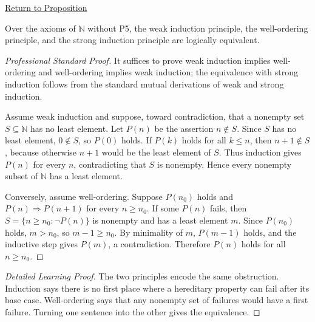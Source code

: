 \newpage
{}
\label{prf:induction-well-ordering-equivalent}

\begin{remark*}[Return]
\hyperref[prop:induction-well-ordering-equivalent]{Return to Proposition}
\end{remark*}

\begin{proposition*}
Over the axioms of $\mathbb{N}$ without P5, the weak induction principle,
the well-ordering principle, and the strong induction principle are
logically equivalent.
\end{proposition*}

\begin{proof}[Professional Standard Proof]
\LRAProofBodyStart
It suffices to prove weak induction implies well-ordering and
well-ordering implies weak induction; the equivalence with strong
induction follows from the standard mutual derivations of weak and strong
induction.

Assume weak induction and suppose, toward contradiction, that a nonempty
set $S \subseteq \mathbb{N}$ has no least element. Let
$P(n)$ be the assertion $n \notin S$. Since $S$ has no least element,
$0 \notin S$, so $P(0)$ holds. If $P(k)$ holds for all $k \le n$, then
$n+1 \notin S$, because otherwise $n+1$ would be the least element of $S$.
Thus induction gives $P(n)$ for every $n$, contradicting that $S$ is
nonempty. Hence every nonempty subset of $\mathbb{N}$ has a least element.

Conversely, assume well-ordering. Suppose $P(n_0)$ holds and
$P(n) \Rightarrow P(n+1)$ for every $n \ge n_0$. If some $P(n)$ fails, then
$S=\{n \ge n_0 : \neg P(n)\}$ is nonempty and has a least element $m$.
Since $P(n_0)$ holds, $m>n_0$, so $m-1 \ge n_0$. By minimality of $m$,
$P(m-1)$ holds, and the inductive step gives $P(m)$, a contradiction.
Therefore $P(n)$ holds for all $n \ge n_0$.
\end{proof}

\begin{proof}[Detailed Learning Proof]
\LRAProofBodyStart
The two principles encode the same obstruction. Induction says there is no
first place where a hereditary property can fail after its base case.
Well-ordering says that any nonempty set of failures would have a first
failure. Turning one sentence into the other gives the equivalence.
\end{proof}


